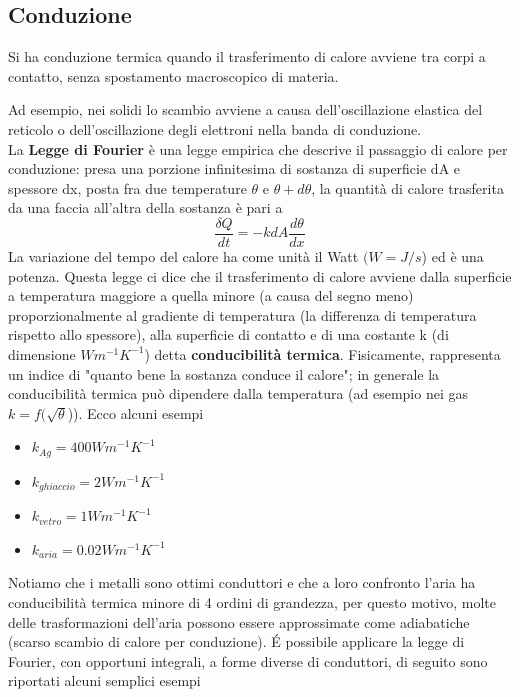 \documentclass[
10pt, %
a4paper, %
oneside, %
headinclude,footinclude, %
BCOR5mm, %
]{scrartcl}
\begin{document}
\subsection{Conduzione}\label{sec:conduzione}
\begin{definition}
	Si ha conduzione termica quando il trasferimento di calore avviene tra corpi a contatto, senza spostamento macroscopico di materia.
\end{definition}
Ad esempio, nei solidi lo scambio avviene a causa dell'oscillazione elastica del reticolo o dell'oscillazione degli elettroni nella banda di conduzione. \\
La \textbf{Legge di Fourier} è una legge empirica che descrive il passaggio di calore per conduzione: presa una porzione infinitesima di sostanza di superficie dA e spessore dx, posta fra due temperature $\theta$ e $\theta+d\theta$, la quantità di calore trasferita da una faccia all'altra della sostanza è pari a 
\[\frac{\delta Q}{dt}= - k dA \frac{d\theta}{dx}\]
La variazione del tempo del calore ha come unità il Watt \((W = J/s\)) ed è una potenza. Questa legge ci dice che il trasferimento di calore avviene dalla superficie a temperatura maggiore a quella minore (a causa del segno meno) proporzionalmente al gradiente di temperatura (la differenza di temperatura rispetto allo spessore), alla superficie di contatto e di una costante k (di dimensione \(W m^{-1} K^{-1}\)) detta \textbf{conducibilità termica}. Fisicamente, rappresenta un indice di "quanto bene la sostanza conduce il calore";  in generale la conducibilità termica può dipendere dalla temperatura (ad esempio nei gas $k = f(\sqrt{\theta}$)). Ecco alcuni esempi
\begin{itemize}
	\item $k_{Ag} = 400 W m^{-1} K^{-1}$
	\item $k_{ghiaccio} = 2 W m^{-1} K^{-1}$
	\item $k_{vetro} = 1 W m^{-1} K^{-1}$
	\item $k_{aria} = 0.02 W m^{-1} K^{-1}$
\end{itemize} 
Notiamo che i metalli sono ottimi conduttori e che a loro confronto l'aria ha conducibilità termica minore di 4 ordini di grandezza, per questo motivo, molte delle trasformazioni dell'aria possono essere approssimate come adiabatiche (scarso scambio di calore per conduzione). \'{E} possibile applicare la legge di Fourier, con opportuni integrali, a forme diverse di conduttori, di seguito sono riportati alcuni semplici esempi
\end{document}
